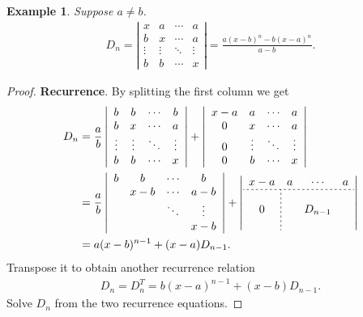 \documentclass{report}
\newtheorem{example}{Example}[section]
\theoremstyle{nonumberplain}
\newtheorem{proof}{Proof.}
\begin{document}
\begin{example}Suppose $a\ne b$.
	\begin{align*}
	D_{n}=\left|\begin{array}{cccc}
			x & a & \cdots & a \\
			b & x & \cdots & a \\
			\vdots & \vdots & \ddots &\vdots  \\
			b & b & \cdots & x
		\end{array}\right|=\frac{a(x-b)^{n}-b(x-a)^{n}}{a-b}.
	\end{align*}
\end{example}
\begin{proof}
	\textbf{Recurrence}. By splitting the first column we get
	\begin{equation*}
		\begin{aligned}
			D_{n}&=\frac{a}{b}\left|\begin{array}{cccc}
				b & b & \cdots & b \\
				b & x & \cdots & a \\
				\vdots & \vdots & \ddots & \vdots \\
				b & b & \cdots&x
			\end{array}\right|+\left|\begin{array}{cccc}
			x-a & a & \cdots & a \\
			0 & x & \cdots & a \\
			0 & \vdots & \ddots &\vdots  \\
			0 & b & \cdots & x
		\end{array}\right| \\
		&=\frac{a}{b}\left|\begin{array}{cccc}
			b & b & \cdots & b \\
			  & x-b & \cdots & a-b \\
			  &   & \ddots & \vdots \\
			  &   &  &x-b
		\end{array}\right|+
		\left|\begin{array}{c;{2pt/2pt}ccc}
			x-a & a & \cdots & a \\\hdashline[2pt/2pt]
			&   &   &   \\
			0 &   & D_{n-1} &   \\
			\phantom{a} &   &   &  
		\end{array}\right| \\
			&=a(x-b)^{n-1}+(x-a) D_{n-1} .
		\end{aligned}
	\end{equation*}
Transpose it to obtain another recurrence relation
\begin{equation*}
	\begin{aligned}
		D_{n}=D_{n}^{T}=b(x-a)^{n-1}+(x-b) D_{n-1}.
	\end{aligned}
\end{equation*}
Solve $D_n$ from the two recurrence equations.
\end{proof}
\newpage
\end{document}
